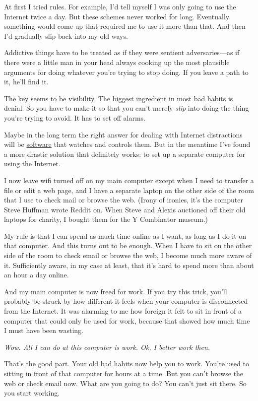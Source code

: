 \documentclass[12pt]{book}
\begin{document}
At first I tried rules. For example, I'd tell myself I was only going to
use the Internet twice a day. But these schemes never worked for long.
Eventually something would come up that required me to use it more than
that. And then I'd gradually slip back into my old ways.

Addictive things have to be treated as if they were sentient
adversaries---as if there were a little man in your head always cooking
up the most plausible arguments for doing whatever you're trying to stop
doing. If you leave a path to it, he'll find it.

The key seems to be visibility. The biggest ingredient in most bad
habits is denial. So you have to make it so that you can't merely
\emph{slip} into doing the thing you're trying to avoid. It has to set
off alarms.

Maybe in the long term the right answer for dealing with Internet
distractions will be \href{http://rescuetime.com}{software} that watches
and controls them. But in the meantime I've found a more drastic
solution that definitely works: to set up a separate computer for using
the Internet.

I now leave wifi turned off on my main computer except when I need to
transfer a file or edit a web page, and I have a separate laptop on the
other side of the room that I use to check mail or browse the web.
(Irony of ironies, it's the computer Steve Huffman wrote Reddit on. When
Steve and Alexis auctioned off their old laptops for charity, I bought
them for the Y Combinator museum.)

My rule is that I can spend as much time online as I want, as long as I
do it on that computer. And this turns out to be enough. When I have to
sit on the other side of the room to check email or browse the web, I
become much more aware of it. Sufficiently aware, in my case at least,
that it's hard to spend more than about an hour a day online.

And my main computer is now freed for work. If you try this trick,
you'll probably be struck by how different it feels when your computer
is disconnected from the Internet. It was alarming to me how foreign it
felt to sit in front of a computer that could only be used for work,
because that showed how much time I must have been wasting.

\emph{Wow. All I can do at this computer is work. Ok, I better work
then.}

That's the good part. Your old bad habits now help you to work. You're
used to sitting in front of that computer for hours at a time. But you
can't browse the web or check email now. What are you going to do? You
can't just sit there. So you start working.
\end{document}

